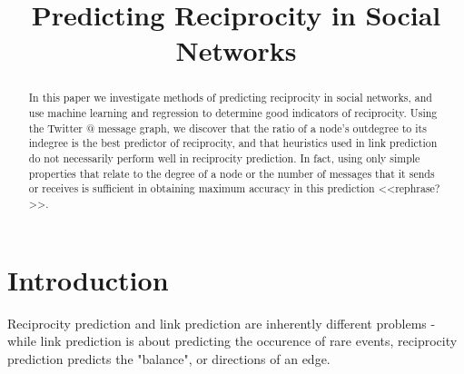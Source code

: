 \documentclass[conference]{IEEEtran}
\begin{document}
\title{Predicting Reciprocity in Social Networks}

\author{
\and
{}
\and
{}
}

\maketitle

\begin{abstract}
In this paper we investigate methods of predicting reciprocity in social networks, and use machine learning and regression to determine good indicators of reciprocity. Using the Twitter @ message graph, we discover that the ratio of a node's outdegree to its indegree is the best predictor of reciprocity, and that heuristics used in link prediction do not necessarily perform well in reciprocity prediction. In fact, using only simple properties that relate to the degree of a node or the number of messages that it sends or receives is sufficient in obtaining maximum accuracy in this prediction <<rephrase?>>.
\end{abstract}


%
\IEEEpeerreviewmaketitle

\section{Introduction}
Reciprocity prediction and link prediction are inherently different problems - while link prediction is about predicting the occurence of rare events, reciprocity prediction predicts the "balance", or directions of an edge.
\end{document}
